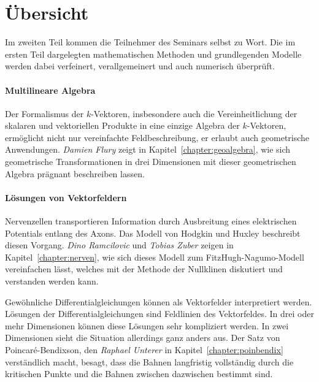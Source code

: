 %
%
%
\chapter*{Übersicht}
\fancyhead[RE]{}
\label{buch:uebersicht}
Im zweiten Teil kommen die Teilnehmer des Seminars selbst zu Wort.
Die im ersten Teil dargelegten mathematischen Methoden und
grundlegenden Modelle werden dabei verfeinert, verallgemeinert
und auch numerisch überprüft.

%
%
\subsubsection{Multilineare Algebra}

%
%
Der Formalismus der $k$-Vektoren, insbesondere auch die Vereinheitlichung
der skalaren und vektoriellen Produkte in eine einzige Algebra der
$k$-Vektoren, ermöglicht nicht nur vereinfachte Feldbeschreibung,
er erlaubt auch geometrische Anwendungen.
\emph{Damien Flury} zeigt in Kapitel~\ref{chapter:geoalgebra}, wie
%
%
sich geometrische Transformationen in drei Dimensionen mit dieser 
%
geometrischen Algebra prägnant beschreiben lassen.

%
%
\subsubsection{Lösungen von Vektorfeldern}

%
%
Nervenzellen transportieren Information durch Ausbreitung eines
%
elektrischen Potentials entlang des Axons.
%
Das Modell von Hodgkin und Huxley beschreibt diesen Vorgang.
%
\emph{Dino Ramcilovic}
%
%
und
\emph{Tobias Zuber}
%
%
zeigen in Kapitel~\ref{chapter:nerven}, wie sich dieses Modell
zum FitzHugh-Nagumo-Modell vereinfachen lässt, welches mit der
%
Methode der Nullklinen diskutiert und verstanden werden kann.
%

%
%
Gewöhnliche Differentialgleichungen können als Vektorfelder interpretiert
werden.
Lösungen der Differentialgleichungen sind Feldlinien des Vektorfeldes.
In drei oder mehr Dimensionen können diese Lösungen sehr kompliziert
werden.
In zwei Dimensionen sieht die Situation allerdings ganz anders aus.
Der Satz von Poincaré-Bendixson, den 
%
\emph{Raphael Unterer}
%
%
in Kapitel~\ref{chapter:poinbendix} verständlich macht, besagt, dass
die Bahnen langfristig vollständig durch die kritischen Punkte
%
und die Bahnen zwischen dazwischen bestimmt sind.

